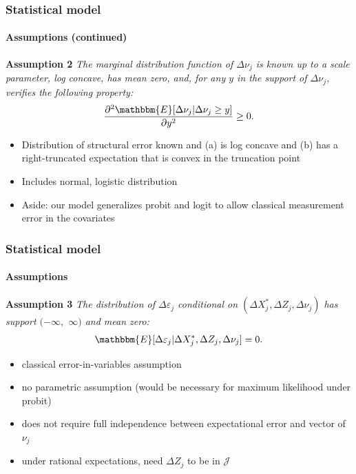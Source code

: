 \documentclass[10pt,letterpaper]{beamer}
\begin{document}

\begin{frame}
\frametitle{Statistical model} \framesubtitle{Assumptions (continued)}

\textbf{Assumption 2} \textit{The marginal distribution function of $%
\Delta\nu_{j}$ is known up to a scale parameter, log concave, has mean zero,
and, for any $y$ in the support of $\Delta\nu_{j}$, verifies the following
property: 
\begin{align*}
\frac{\partial^{2}\mathbbm{E}[\Delta\nu_{j}|\Delta\nu_{j}\geq y]}{\partial
y^{2}}\geq 0.
\end{align*}%
} \pause

\begin{itemize}
\item Distribution of structural error known and (a) is log concave and (b)
has a right-truncated expectation that is convex in the truncation point

\item Includes normal, logistic distribution

\item Aside: our model generalizes probit and logit to allow classical
measurement error in the covariates
\end{itemize}
\end{frame}


\begin{frame}
\frametitle{Statistical model} \framesubtitle{Assumptions}

\textbf{Assumption 3} \textit{The distribution of $\Delta\varepsilon_{j}$
conditional on $(\Delta X^{*}_{j},\Delta Z_{j},\Delta \nu_{j})$ has support $%
(-\infty,$ $\infty)$ and mean zero: 
\begin{align*}
\mathbbm{E}[\Delta\varepsilon_{j}|\Delta X^{*}_{j},\Delta
Z_{j},\Delta\nu_{j}]=0.
\end{align*}%
} \pause

\begin{itemize}
\item classical error-in-variables assumption

\item no parametric assumption (would be necessary for maximum likelihood
under probit)

\item does not require full independence between expectational error and
vector of $\nu_{j}$

\item under rational expectations, need $\Delta Z_{j}$ to be in $\mathcal{J}$
\end{itemize}
\end{frame}
\end{document}
